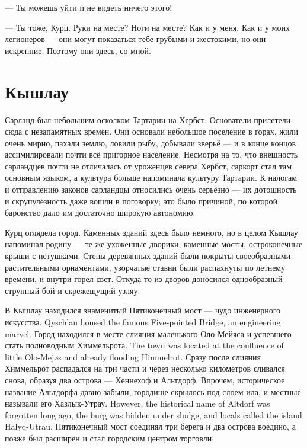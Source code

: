 --- Ты можешь уйти и не видеть ничего этого!

--- Ты тоже, Курц.
Руки на месте?
Ноги на месте?
Как и у меня.
Как и у моих легионеров --- они могут показаться тебе грубыми и жестокими, но они искренние.
Поэтому они здесь, со мной.

\section{Кышлау}

Сарланд был небольшим осколком Тартарии на Хербст.
Основатели прилетели сюда с незапамятных времён.
Они основали небольшое поселение в горах, жили очень мирно, пахали землю, ловили рыбу, добывали зверьё --- и в конце концов ассимилировали почти всё пригорное население.
Несмотря на то, что внешность сарландцев почти не отличалась от уроженцев севера Хербст, саркорт стал там основным языком, а культура больше напоминала культуру Тартарии.
К налогам и отправлению законов сарландцы относились очень серьёзно --- их дотошность и скрупулёзность даже вошли в поговорку;
это было причиной, по которой баронство дало им достаточно широкую автономию.

Курц оглядела город.
Каменных зданий здесь было немного, но в целом Кышлау напоминал родину --- те же ухоженные дворики, каменные мосты, остроконечные крыши с петушками.
Стены деревянных зданий были покрыты своеобразными растительными орнаментами, узорчатые ставни были распахнуты по летнему времени, и внутри горел свет.
Откуда-то из дворов доносился однообразный струнный бой и скрежещущий узляу.

{В Кышлау находился знаменитый Пятиконечный мост --- чудо инженерного искусства.}
{Qyschlau housed the famous Five-pointed Bridge, an engineering marvel.}
{Город находился в месте слияния маленького Оло-Мейяса и успевшего стать полноводным Химмельрота.}
{The town was located at the confluence of little Olo-Mej\o{}s and already flooding Himmelrot.}
Сразу после слияния Химмельрот распадался на три части и через несколько километров сливался снова, образуя два острова --- Хеннехоф и Альтдорф.
{Впрочем, историческое название Альтдорфа давно забыли, городище скрылось под слоем ила, и местные называли его Хазлык-Утрау.}
{However, the historical name of Altdorf was forgotten long ago, the burg was hidden under sludge, and locals called the island Ha\dh{}lyq-Utrau.}
Пятиконечный мост соединял три берега и два острова воедино, а позже был расширен и стал городским центром торговли.

